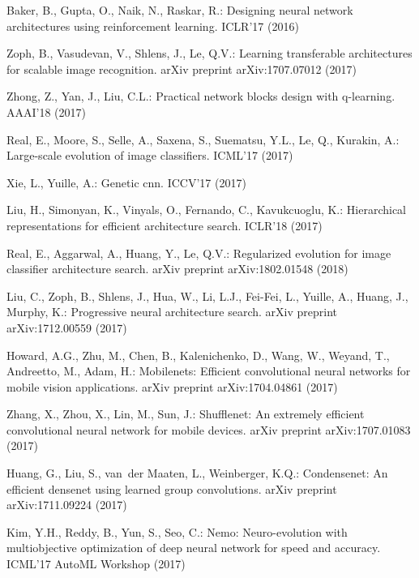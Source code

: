 \documentclass[runningheads]{llncs}
\begin{document}
\begin{thebibliography}{10}
Baker, B., Gupta, O., Naik, N., Raskar, R.:
\newblock Designing neural network architectures using reinforcement learning.
\newblock ICLR'17 (2016)

Zoph, B., Vasudevan, V., Shlens, J., Le, Q.V.:
\newblock Learning transferable architectures for scalable image recognition.
\newblock arXiv preprint arXiv:1707.07012 (2017)

Zhong, Z., Yan, J., Liu, C.L.:
\newblock Practical network blocks design with q-learning.
\newblock AAAI'18 (2017)

Real, E., Moore, S., Selle, A., Saxena, S., Suematsu, Y.L., Le, Q., Kurakin,
  A.:
\newblock Large-scale evolution of image classifiers.
\newblock ICML'17 (2017)

Xie, L., Yuille, A.:
\newblock Genetic cnn.
\newblock ICCV'17 (2017)

Liu, H., Simonyan, K., Vinyals, O., Fernando, C., Kavukcuoglu, K.:
\newblock Hierarchical representations for efficient architecture search.
\newblock ICLR'18 (2017)

Real, E., Aggarwal, A., Huang, Y., Le, Q.V.:
\newblock Regularized evolution for image classifier architecture search.
\newblock arXiv preprint arXiv:1802.01548 (2018)

Liu, C., Zoph, B., Shlens, J., Hua, W., Li, L.J., Fei-Fei, L., Yuille, A.,
  Huang, J., Murphy, K.:
\newblock Progressive neural architecture search.
\newblock arXiv preprint arXiv:1712.00559 (2017)

Howard, A.G., Zhu, M., Chen, B., Kalenichenko, D., Wang, W., Weyand, T.,
  Andreetto, M., Adam, H.:
\newblock Mobilenets: Efficient convolutional neural networks for mobile vision
  applications.
\newblock arXiv preprint arXiv:1704.04861 (2017)

Zhang, X., Zhou, X., Lin, M., Sun, J.:
\newblock Shufflenet: An extremely efficient convolutional neural network for
  mobile devices.
\newblock arXiv preprint arXiv:1707.01083 (2017)

Huang, G., Liu, S., van~der Maaten, L., Weinberger, K.Q.:
\newblock Condensenet: An efficient densenet using learned group convolutions.
\newblock arXiv preprint arXiv:1711.09224 (2017)

Kim, Y.H., Reddy, B., Yun, S., Seo, C.:
\newblock Nemo: Neuro-evolution with multiobjective optimization of deep neural
  network for speed and accuracy.
\newblock ICML'17 AutoML Workshop (2017)


\end{thebibliography}
\end{document}
